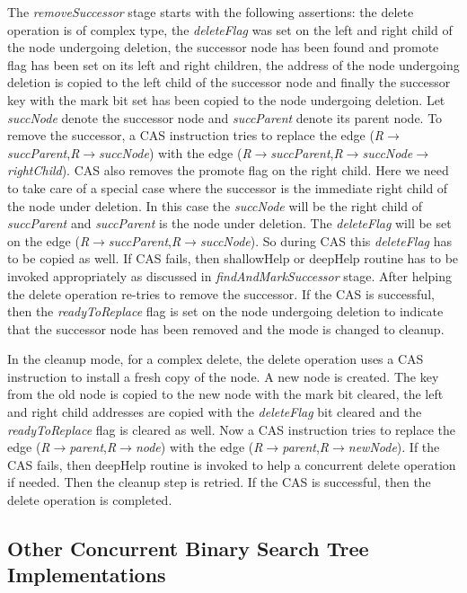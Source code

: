 \documentclass[11pt]{article}
\begin{document}
\begin{multicols}{2}
The \textit{removeSuccessor} stage starts with the following assertions: the delete operation is of complex type, the \textit{deleteFlag} was set on the left and right child of the node undergoing deletion, the successor node has been found and promote flag has been set on its left and right children, the address of the node undergoing deletion is copied to the left child of the successor node and finally the successor key with the mark bit set has been copied to the node undergoing deletion. Let \textit{succNode} denote the successor node and \textit{succParent} denote its parent node. To remove the successor, a CAS instruction tries to replace the edge (\textit{R$\rightarrow$succParent},\textit{R$\rightarrow$succNode}) with the edge (\textit{R$\rightarrow$succParent},\textit{R$\rightarrow$succNode$\rightarrow$rightChild}). CAS also removes the promote flag on the right child. Here we need to take care of a special case where the successor is the immediate right child of the node under deletion. In this case the \textit{succNode} will be the right child of \textit{succParent} and \textit{succParent} is the node under deletion. The \textit{deleteFlag} will be set on the edge (\textit{R$\rightarrow$succParent},\textit{R$\rightarrow$succNode}). So during CAS this \textit{deleteFlag} has to be copied as well. If CAS fails, then shallowHelp or deepHelp routine has to be invoked appropriately as discussed in \textit{findAndMarkSuccessor} stage. After helping the delete operation re-tries to remove the successor. If the CAS is successful, then the \textit{readyToReplace} flag is set on the node undergoing deletion to indicate that the successor node has been removed and the mode is changed to cleanup.

In the cleanup mode, for a complex delete, the delete operation uses a CAS instruction to install a fresh copy of the node. A new node is created. The key from the old node is copied to the new node with the mark bit cleared, the left and right child addresses are copied with the \textit{deleteFlag} bit cleared and the \textit{readyToReplace} flag is cleared as well. Now a CAS instruction tries to replace the edge (\textit{R$\rightarrow$parent},\textit{R$\rightarrow$node}) with the edge (\textit{R$\rightarrow$parent},\textit{R$\rightarrow$newNode}). If the CAS fails, then deepHelp routine is invoked to help a concurrent delete operation if needed. Then the cleanup step is retried. If the CAS is successful, then the delete operation is completed.


\subsection{Other Concurrent Binary Search Tree Implementations}

\end{multicols}
\end{document}
